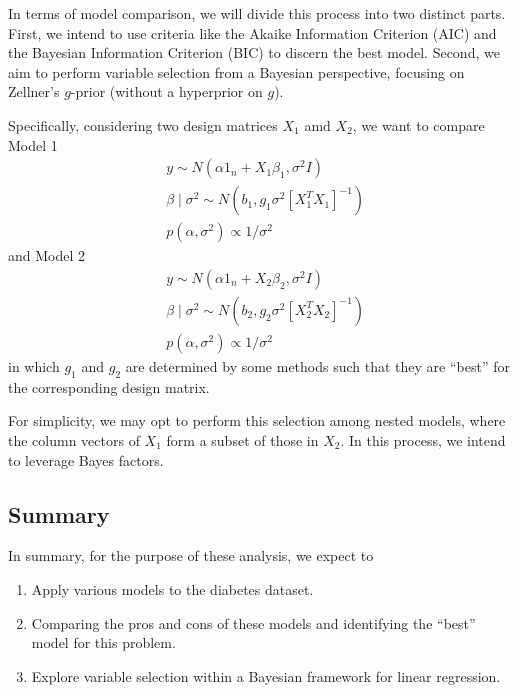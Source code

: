 \documentclass[12pt,a4paper]{article}
\begin{document}
In terms of model comparison, we will divide this process into two distinct parts. First, we intend to use criteria like the Akaike Information Criterion (AIC) and the Bayesian Information Criterion (BIC) to discern the best model. Second, we aim to perform variable selection from a Bayesian perspective, focusing on Zellner's $g$-prior (without a hyperprior on $g$).

Specifically, considering two design matrices $X_1$ amd $X_2$, we want to compare Model 1
\begin{align*}
&y \sim N\left(\alpha 1_n+X_1 \beta_1, \sigma^2 I\right) \\
&\beta \mid \sigma^2 \sim N\left(b_1, g_1 \sigma^2\left[X_1^{T}X_1\right]^{-1}\right) \\
&p\left(\alpha, \sigma^2\right) \propto 1 / \sigma^2
\end{align*}
and Model 2
\begin{align*}
&y \sim N\left(\alpha 1_n+X_2 \beta_2, \sigma^2 I\right) \\
&\beta \mid \sigma^2 \sim N\left(b_2, g_2 \sigma^2\left[X_2^{T}X_2\right]^{-1}\right) \\
&p\left(\alpha, \sigma^2\right) \propto 1 / \sigma^2
\end{align*}
in which $g_1$ and $g_2$ are determined by some methods such that they are “best” for the corresponding design matrix.

For simplicity, we may opt to perform this selection among nested models, where the column vectors of $X_1$ form a subset of those in $X_2$. In this process, we intend to leverage Bayes factors.

\subsection{Summary}
In summary, for the purpose of these analysis, we expect to 
\begin{enumerate}
    \item Apply various models to the diabetes dataset.
    \item Comparing the pros and cons of these models and identifying the “best” model for this problem.
    \item Explore variable selection within a Bayesian framework for linear regression.
\end{enumerate}
\end{document}
